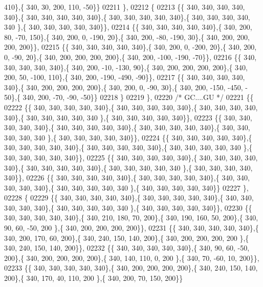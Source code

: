 \begin{DoxyCode}
      410\},\{ 340,  30, 200, 110, -50\}\}
02211 \},
02212 \{
02213 \{\{ 340, 340, 340, 340, 340\},\{ 340, 340, 340, 340, 340\},\{ 340, 340, 340, 340, 340\},\{ 340, 340, 340, 340, 340
      \},\{ 340, 340, 340, 340, 340\}\},
02214 \{\{ 340, 340, 340, 340, 340\},\{ 340, 200,  80, -70, 150\},\{ 340, 200,   0, -190,  20\},\{ 340, 200, -80, -190,  
      30\},\{ 340, 200, 200, 200, 200\}\},
02215 \{\{ 340, 340, 340, 340, 340\},\{ 340, 200,   0, -200,  20\},\{ 340, 200,   0, -90,  20\},\{ 340, 200, 200, 200, 
      200\},\{ 340, 200, -100, -190, -70\}\},
02216 \{\{ 340, 340, 340, 340, 340\},\{ 340, 200, -10, -130,  90\},\{ 340, 200, 200, 200, 200\},\{ 340, 200,  50, -100, 
      110\},\{ 340, 200, -190, -490, -90\}\},
02217 \{\{ 340, 340, 340, 340, 340\},\{ 340, 200, 200, 200, 200\},\{ 340, 200,   0, -90,  30\},\{ 340, 200, -150, -450, -
      50\},\{ 340, 200, -70, -90, -50\}\}
02218 \}
02219 \},
02220 \textcolor{comment}{/* GC....GU */}
02221 \{\{
02222 \{\{ 340, 340, 340, 340, 340\},\{ 340, 340, 340, 340, 340\},\{ 340, 340, 340, 340, 340\},\{ 340, 340, 340, 340, 340
      \},\{ 340, 340, 340, 340, 340\}\},
02223 \{\{ 340, 340, 340, 340, 340\},\{ 340, 340, 340, 340, 340\},\{ 340, 340, 340, 340, 340\},\{ 340, 340, 340, 340, 340
      \},\{ 340, 340, 340, 340, 340\}\},
02224 \{\{ 340, 340, 340, 340, 340\},\{ 340, 340, 340, 340, 340\},\{ 340, 340, 340, 340, 340\},\{ 340, 340, 340, 340, 340
      \},\{ 340, 340, 340, 340, 340\}\},
02225 \{\{ 340, 340, 340, 340, 340\},\{ 340, 340, 340, 340, 340\},\{ 340, 340, 340, 340, 340\},\{ 340, 340, 340, 340, 340
      \},\{ 340, 340, 340, 340, 340\}\},
02226 \{\{ 340, 340, 340, 340, 340\},\{ 340, 340, 340, 340, 340\},\{ 340, 340, 340, 340, 340\},\{ 340, 340, 340, 340, 340
      \},\{ 340, 340, 340, 340, 340\}\}
02227 \},
02228 \{
02229 \{\{ 340, 340, 340, 340, 340\},\{ 340, 340, 340, 340, 340\},\{ 340, 340, 340, 340, 340\},\{ 340, 340, 340, 340, 340
      \},\{ 340, 340, 340, 340, 340\}\},
02230 \{\{ 340, 340, 340, 340, 340\},\{ 340, 210, 180,  70, 200\},\{ 340, 190, 160,  50, 200\},\{ 340,  90,  60, -50, 200
      \},\{ 340, 200, 200, 200, 200\}\},
02231 \{\{ 340, 340, 340, 340, 340\},\{ 340, 200, 170,  60, 200\},\{ 340, 240, 150, 140, 200\},\{ 340, 200, 200, 200, 200
      \},\{ 340, 240, 150, 140, 200\}\},
02232 \{\{ 340, 340, 340, 340, 340\},\{ 340,  90,  60, -50, 200\},\{ 340, 200, 200, 200, 200\},\{ 340, 140, 110,   0, 200
      \},\{ 340,  70, -60,  10, 200\}\},
02233 \{\{ 340, 340, 340, 340, 340\},\{ 340, 200, 200, 200, 200\},\{ 340, 240, 150, 140, 200\},\{ 340, 170,  40, 110, 200
      \},\{ 340, 200,  70, 150, 200\}\}

\end{DoxyCode}
